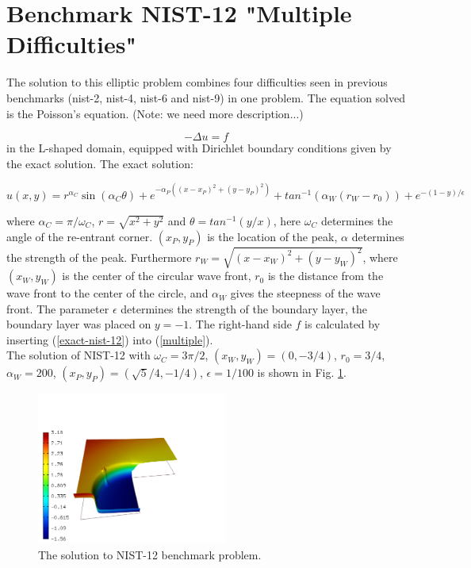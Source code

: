\section{Benchmark NIST-12 "Multiple Difficulties"}
\label{sec:bench-12}

The solution to this elliptic problem combines four difficulties seen in previous benchmarks (nist-2, nist-4, nist-6 and nist-9) in one problem.
The equation solved is the Poisson's equation. (Note: we need more description...)

\begin{equation} \label{multiple}
-\Delta u = f 
\end{equation}
in the L-shaped domain, equipped with Dirichlet boundary conditions
given by the exact solution.
The exact solution:

\begin{equation}\label{exact-nist-12}
u(x,y) =  r^{\alpha_{C} }\sin(\alpha_{C} \theta)
+ e^{-\alpha_{P} ((x - x_{P})^{2} + (y - y_{P})^{2})}
+ tan^{-1}(\alpha_{W} (r_{W} - r_{0}))
+ e^{-(1 - y) / \epsilon}
\end{equation}

where $\alpha_C = \pi / \omega_C$, $r = \sqrt{x^2+y^2}$
and $\theta = tan^{-1}(y/x)$, here $\omega_C$ determines
the angle of the re-entrant corner.
$(x_{P}, y_{P})$ is the location of the peak, $\alpha$
determines the strength of the peak. Furthermore
$r_{W} = \sqrt{(x - x_{W})^{2} + (y - y_{W})^{2}}$,
where $(x_{W}, y_{W})$ is the center of the circular wave front,
$r_{0}$ is the distance from the wave front to the
center of the circle, and $\alpha_W$ gives
the steepness of the wave front. The parameter $\epsilon$ determines the
strength of the boundary layer, the boundary layer was placed on $y = -1$.
The right-hand side $f$ is calculated by inserting (\ref{exact-nist-12})
into (\ref{multiple}). \\

The solution of NIST-12 with $\omega_C = 3 \pi /2$,
$(x_{W}, y_{W}) = (0, -3/4)$, $r_{0} = 3/4$, $\alpha_{W} = 200$,
$(x_{P}, y_{P}) = (\sqrt{5} / 4, -1/4)$,
$\epsilon = 1/100$ is shown in Fig. \ref{fig:sln-nist12}.

\begin{figure}[!ht]
\centering
\includegraphics[height=5cm]{nist/nist-12/solution.png}
\caption{The solution to NIST-12 benchmark problem.}
\label{fig:sln-nist12}
\end{figure}

